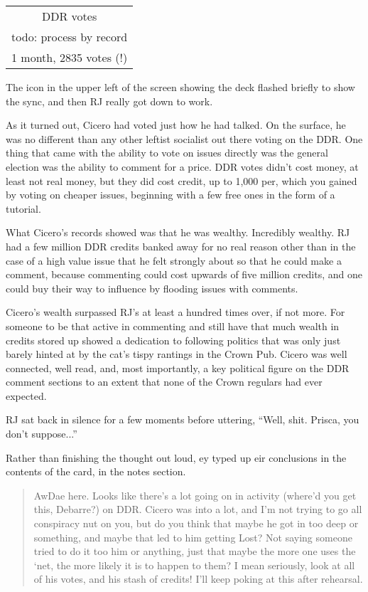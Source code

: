 \begin{tabular}{| c |}
  \hline
  DDR votes\\
  todo: process by record\\
  1 month, 2835 votes (!)\\
  \hline
\end{tabular}

The icon in the upper left of the screen showing the deck flashed briefly to show the sync, and then RJ really got down to work.

As it turned out, Cicero had voted just how he had talked. On the surface, he was no different than any other leftist socialist out there voting on the DDR. One thing that came with the ability to vote on issues directly was the general election was the ability to comment for a price. DDR votes didn't cost money, at least not real money, but they did cost credit, up to 1,000 per, which you gained by voting on cheaper issues, beginning with a few free ones in the form of a tutorial.

What Cicero's records showed was that he was wealthy. Incredibly wealthy. RJ had a few million DDR credits banked away for no real reason other than in the case of a high value issue that he felt strongly about so that he could make a comment, because commenting could cost upwards of five million credits, and one could buy their way to influence by flooding issues with comments.

Cicero's wealth surpassed RJ's at least a hundred times over, if not more. For someone to be that active in commenting and still have that much wealth in credits stored up showed a dedication to following politics that was only just barely hinted at by the cat's tispy rantings in the Crown Pub. Cicero was well connected, well read, and, most importantly, a key political figure on the DDR comment sections to an extent that none of the Crown regulars had ever expected.

RJ sat back in silence for a few moments before uttering, ``Well, shit. Prisca, you don't suppose...''

Rather than finishing the thought out loud, ey typed up eir conclusions in the contents of the card, in the notes section.

\begin{quote}
  AwDae here. Looks like there's a lot going on in activity (where'd you get this, Debarre?) on DDR. Cicero was into a lot, and I'm not trying to go all conspiracy nut on you, but do you think that maybe he got in too deep or something, and maybe that led to him getting Lost? Not saying someone tried to do it too him or anything, just that maybe the more one uses the `net, the more likely it is to happen to them? I mean seriously, look at all of his votes, and his stash of credits! I'll keep poking at this after rehearsal.
\end{quote}

